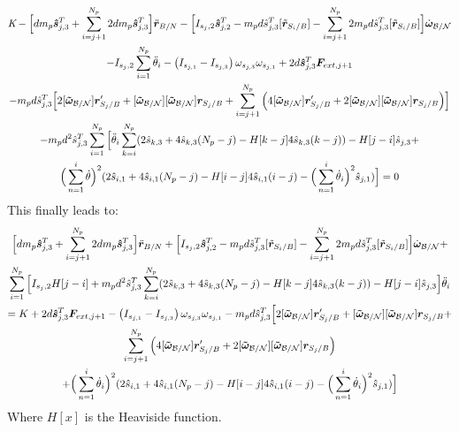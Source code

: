 \begin{multline}
	\textit{K} - \Big[d m_p\bm{\hat{s}}^{T}_{j,3}+\sum^{N_p}_{i=j+1}2 d m_p\bm{\hat{s}}^{T}_{j,3}\Big]\ddot{\bm r}_{B/N} - \Big[I_{s_j,2} \bm{\hat{s}}_{j,2}^T -m_p d \hat{s}^{T}_{j,3}[\tilde{{\bm r}}_{S_{i}/B}]-\sum^{N_p}_{i=j+1} 2 m_p d \hat{s}^{T}_{j,3}[\tilde{{\bm r}}_{S_{i}/B}]\Big]\dot{\bm\omega}_{\cal B/N} \\
	-I_{s_j,2} \sum^{N_p}_{i=1}\ddot{\theta}_i - \left( I_{s_{j,1}} - I_{s_{j,3}}\right) \omega_{s_{j,3}} \omega_{s_{j,1}}+ 2d\bm{\hat{s}}^{T}_{j,3}\bm F_{ext,j+1}\\
	-m_p d \hat{s}^{T}_{j,3}\Big[2[\bm{\tilde{\omega}}_{\cal B/N}]\bm r'_{S_{j}/B} + [\bm{\tilde{\omega}}_{\cal B/N}][\bm{\tilde{\omega}}_{\cal B/N}]\bm r_{S_{j}/B}+\sum^{N_p}_{i=j+1}\Big(4[\bm{\tilde{\omega}}_{\cal B/N}]\bm r'_{S_{j}/B} + 2[\bm{\tilde{\omega}}_{\cal B/N}][\bm{\tilde{\omega}}_{\cal B/N}]\bm r_{S_{j}/B} \Big)\Big]\\
	-m_p d^2 \hat{s}^{T}_{j,3}\sum^{N_p}_{i=1}\Big[\ddot{\theta}_i \sum^{N_p}_{k=i}(2\hat{s}_{k,3}+4\hat{s}_{k,3}(N_p-j) -H[k-j] 4\hat{s}_{k,3}(k-j)) - H[j-i]\hat{s}_{j,3} + \\
	\Big( \sum^{i}_{n=1} \dot{\theta}\Big)^2 (2\hat{s}_{i,1}+4\hat{s}_{i,1}(N_p-j) -H[i-j] 4\hat{s}_{i,1}(i-j) - \Big( \sum^{i}_{n=1} \dot{\theta}_i\Big)^2 \hat{s}_{j,1} ) \Big] = 0 
\end{multline}
This finally leads to:
\begin{multline}
	\Big[d m_p\bm{\hat{s}}^{T}_{j,3}+\sum^{N_p}_{i=j+1}2 d m_p\bm{\hat{s}}^{T}_{j,3}\Big]\ddot{\bm r}_{B/N} + \Big[I_{s_j,2} \bm{\hat{s}}_{j,2}^T -m_p d \hat{s}^{T}_{j,3}[\tilde{{\bm r}}_{S_{i}/B}]-\sum^{N_p}_{i=j+1} 2 m_p d \hat{s}^{T}_{j,3}[\tilde{{\bm r}}_{S_{i}/B}]\Big]\dot{\bm\omega}_{\cal B/N} +\\
	\sum^{N_p}_{i=1}\Big[I_{s_j,2} H[j-i] + m_p d^2 \hat{s}^{T}_{j,3} \sum^{N_p}_{k=i}(2\hat{s}_{k,3}+4\hat{s}_{k,3}(N_p-j) -H[k-j] 4\hat{s}_{k,3}(k-j)) - H[j-i]\hat{s}_{j,3} \Big] \ddot{\theta}_i\\
	= K + 2d\bm{\hat{s}}^{T}_{j,3}\bm F_{ext,j+1} - \left( I_{s_{j,1}} - I_{s_{j,3}}\right) \omega_{s_{j,3}} \omega_{s_{j,1}} - m_p d \hat{s}^{T}_{j,3}\Big[2[\bm{\tilde{\omega}}_{\cal B/N}]\bm r'_{S_{j}/B} + [\bm{\tilde{\omega}}_{\cal B/N}][\bm{\tilde{\omega}}_{\cal B/N}]\bm r_{S_{j}/B}+\\
	\sum^{N_p}_{i=j+1}\Big(4[\bm{\tilde{\omega}}_{\cal B/N}]\bm r'_{S_{j}/B} + 2[\bm{\tilde{\omega}}_{\cal B/N}][\bm{\tilde{\omega}}_{\cal B/N}]\bm r_{S_{j}/B} \Big) \\
	+ \Big( \sum^{i}_{n=1} \dot{\theta}_i \Big)^2 (2\hat{s}_{i,1}+4\hat{s}_{i,1}(N_p-j) -H[i-j] 4\hat{s}_{i,1}(i-j) - \Big( \sum^{i}_{n=1} \dot{\theta}_i\Big)^2 \hat{s}_{j,1} )\Big]
	\label{eq:flexr}
\end{multline}
Where $H[x]$ is the Heaviside function.


